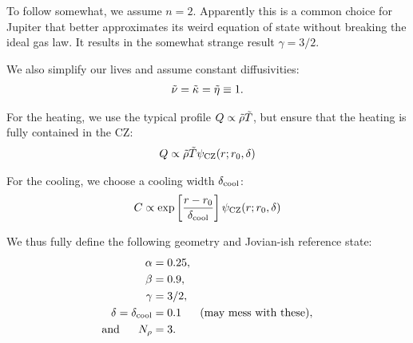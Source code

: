 \documentclass[12pt]{article}
\numberwithin{equation}{section}
\newcommand{\cz}{_{\rm{CZ}}}
\newcommand{\dcool}{\delta_{\rm{cool}}}
\begin{document}
To follow \citet{Jones2011} \citet{Heimpel2022} somewhat, we assume $n=2$. Apparently this is a common choice for Jupiter that better approximates its weird equation of state without breaking the ideal gas law. It results in the somewhat strange result $\gamma=3/2$. 

We also simplify our lives and assume constant diffusivities:
\begin{align}
	\tilde{\nu}=\tilde{\kappa}=\tilde{\eta}\equiv 1.
\end{align}

For the heating, we use the typical {\rayleigh} profile $Q\propto \tilde{\rho} \tilde{T}$, but ensure that the heating is fully contained in the CZ:
\begin{align}
	Q \propto \rhotilde\tmptilde \psi\cz(r; r_0,\delta)
\end{align} 

For the cooling, we choose a cooling width $\dcool$:
\begin{align}
	C \propto \exp\left[\frac{r-r_0}{\dcool}\right] \psi\cz(r; r_0,\delta)
\end{align}

We thus fully define the following geometry and Jovian-ish reference state:
\begin{subequations}
	\begin{align}
		\alpha &= 0.25,\\
		\beta &= 0.9,\\
		\gamma &= 3/2,\\
		\delta=\dcool &= 0.1\five \text{(may mess with these)},\\
		\andd N_\rho &= 3.
	\end{align}
\end{subequations}
\clearpage
\newpage
%
	
\end{document}
